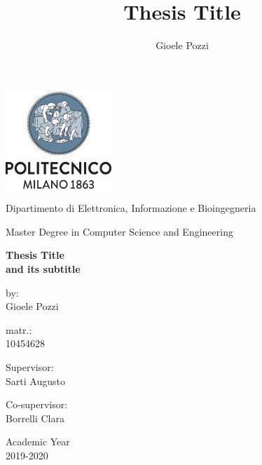 \documentclass[oneside]{book}
\author{Gioele Pozzi}
\title{Thesis Title}
\begin{document}
\centering
\includegraphics[width=4cm]{../img/logo_polimi.png}

\vspace{1cm}
Dipartimento di Elettronica, Informazione e Bioingegneria

\vspace{0.25cm}
Master Degree in Computer Science and Engineering

\vspace{2cm}
\centering

\color{BrickRed}
\Huge
\textbf{
Thesis Title \\%
\Large and its subtitle}

\normalsize
\vspace{2cm}
\color{black}
\flushright
by:\\Gioele Pozzi

\vspace{0.5cm}
matr.:\\10454628

\vspace{0.5cm}
\flushleft
Supervisor:\\ Sarti Augusto

\vspace{0.5cm}
Co-supervisor:\\ Borrelli Clara



\vfill
\centering
Academic Year \\ 2019-2020

\end{document}
